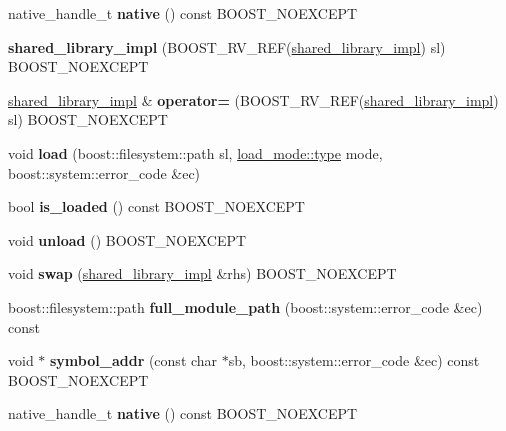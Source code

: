 \begin{DoxyCompactItemize}
\item 
native\+\_\+handle\+\_\+t {\bfseries native} () const B\+O\+O\+S\+T\+\_\+\+N\+O\+E\+X\+C\+E\+PT\hypertarget{a00272_a0517caf0566e0bbc2573a9e9f427fa92}{}\label{a00272_a0517caf0566e0bbc2573a9e9f427fa92}

\item 
{\bfseries shared\+\_\+library\+\_\+impl} (B\+O\+O\+S\+T\+\_\+\+R\+V\+\_\+\+R\+EF(\hyperlink{a00272}{shared\+\_\+library\+\_\+impl}) sl) B\+O\+O\+S\+T\+\_\+\+N\+O\+E\+X\+C\+E\+PT\hypertarget{a00272_a45d5bb26fa73a9639618bab3e343f114}{}\label{a00272_a45d5bb26fa73a9639618bab3e343f114}

\item 
\hyperlink{a00272}{shared\+\_\+library\+\_\+impl} \& {\bfseries operator=} (B\+O\+O\+S\+T\+\_\+\+R\+V\+\_\+\+R\+EF(\hyperlink{a00272}{shared\+\_\+library\+\_\+impl}) sl) B\+O\+O\+S\+T\+\_\+\+N\+O\+E\+X\+C\+E\+PT\hypertarget{a00272_a4516d0b76678a60333cb5ccbf7cc52c2}{}\label{a00272_a4516d0b76678a60333cb5ccbf7cc52c2}

\item 
void {\bfseries load} (boost\+::filesystem\+::path sl, \hyperlink{a00729_a1918a602801479bc0bade54ff5665129}{load\+\_\+mode\+::type} mode, boost\+::system\+::error\+\_\+code \&ec)\hypertarget{a00272_a2c3bbcf10638f5fdeb13b1f194431ac5}{}\label{a00272_a2c3bbcf10638f5fdeb13b1f194431ac5}

\item 
bool {\bfseries is\+\_\+loaded} () const B\+O\+O\+S\+T\+\_\+\+N\+O\+E\+X\+C\+E\+PT\hypertarget{a00272_a3729718e9c72b30a85087a89b642becb}{}\label{a00272_a3729718e9c72b30a85087a89b642becb}

\item 
void {\bfseries unload} () B\+O\+O\+S\+T\+\_\+\+N\+O\+E\+X\+C\+E\+PT\hypertarget{a00272_a78b3736f4aab0a61fd07a45eb5a54c52}{}\label{a00272_a78b3736f4aab0a61fd07a45eb5a54c52}

\item 
void {\bfseries swap} (\hyperlink{a00272}{shared\+\_\+library\+\_\+impl} \&rhs) B\+O\+O\+S\+T\+\_\+\+N\+O\+E\+X\+C\+E\+PT\hypertarget{a00272_a7d87e32878fd68cd3c59531c5b6dcaf1}{}\label{a00272_a7d87e32878fd68cd3c59531c5b6dcaf1}

\item 
boost\+::filesystem\+::path {\bfseries full\+\_\+module\+\_\+path} (boost\+::system\+::error\+\_\+code \&ec) const \hypertarget{a00272_a67a07a86c8455bf7c5cde77d69e5f994}{}\label{a00272_a67a07a86c8455bf7c5cde77d69e5f994}

\item 
void $\ast$ {\bfseries symbol\+\_\+addr} (const char $\ast$sb, boost\+::system\+::error\+\_\+code \&ec) const B\+O\+O\+S\+T\+\_\+\+N\+O\+E\+X\+C\+E\+PT\hypertarget{a00272_a79bc56fc8e9c4fb98993893b491986a8}{}\label{a00272_a79bc56fc8e9c4fb98993893b491986a8}

\item 
native\+\_\+handle\+\_\+t {\bfseries native} () const B\+O\+O\+S\+T\+\_\+\+N\+O\+E\+X\+C\+E\+PT\hypertarget{a00272_a0517caf0566e0bbc2573a9e9f427fa92}{}\label{a00272_a0517caf0566e0bbc2573a9e9f427fa92}

\end{DoxyCompactItemize}
